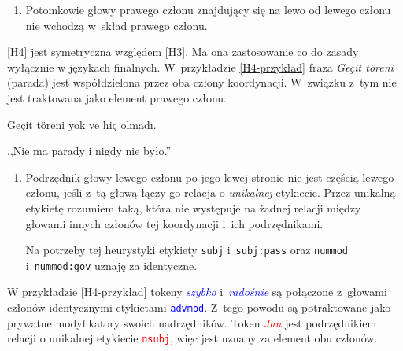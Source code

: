 \begin{enumerate}
\item[\namedlabel{H4}{(H4)}]
Potomkowie głowy prawego członu znajdujący się na lewo od lewego członu nie wchodzą w~skład prawego członu.
\end{enumerate}

\ref{H4} jest symetryczna względem \ref{H3}. Ma ona zastosowanie co do zasady wyłącznie w językach finalnych. W~przykładzie \eqref{H4-przykład} fraza \textit{Geçit töreni} (parada) jest współdzielona przez oba człony koordynacji. W~związku z~tym nie jest traktowana jako element prawego członu.

\begin{exe}
\ex \label{H4-przykład}
Geçit töreni yok ve hiç olmadı.

,,Nie ma parady i nigdy nie było.''
\end{exe}

\begin{enumerate}
\item[\namedlabel{H5}{(H5)}]
Podrzędnik głowy lewego członu po jego lewej stronie nie jest częścią lewego członu, jeśli z~tą głową łączy go relacja o \emph{unikalnej} etykiecie. Przez unikalną etykietę rozumiem taką, która nie występuje na żadnej relacji między głowami innych członów tej koordynacji i~ich podrzędnikami. 

Na potrzeby tej heurystyki etykiety \texttt{subj} i~\texttt{subj:pass} oraz \texttt{nummod} i~\texttt{nummod:gov} uznaję za identyczne.
\end{enumerate}

W przykładzie \eqref{H4-przykład} tokeny \textcolor{blue}{\textit{szybko}} i~\textcolor{blue}{\textit{radośnie}} są połączone z~głowami członów identycznymi etykietami \textcolor{blue}{\texttt{advmod}}. Z~tego powodu są potraktowane jako prywatne modyfikatory swoich nadrzędników. Token \textcolor{red}{\textit{Jan}} jest podrzędnikiem relacji o unikalnej etykiecie \textcolor{red}{\texttt{nsubj}}, więc jest uznany za element obu członów.

